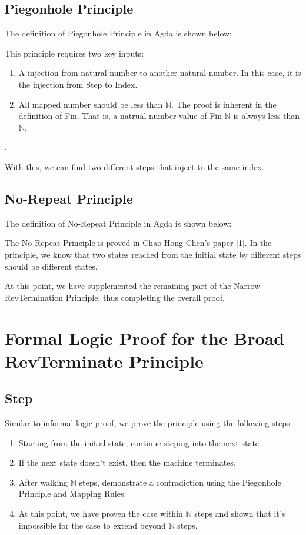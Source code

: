 \subsection{ Piegonhole Principle }
The definition of Piegonhole Principle in Agda is shown below:



This principle requires two key inputs:
\begin{enumerate}[1.]
    \item A injection from natural number to another natural number. In this case, it is the injection from Step to Index. 
    \item All mapped number should be less than $\mathbb{N}$.  The proof is inherent in the definition of Fin.  That is, a natrual number value of Fin $\mathbb{N}$ is always less than $\mathbb{N}$.
\end{enumerate}.

With this, we can find two different steps that inject to the same index.

\subsection{ No-Repeat Principle }
The definition of No-Repeat Principle in Agda is shown below:

The No-Repeat Principle is proved in Chao-Hong Chen's paper [1].  
In the principle, we know that two states reached from the initial state by different steps should be different states.



At this point, we have supplemented the remaining part of the Narrow RevTermination Principle, thus completing the overall proof.

\section{Formal Logic Proof for the Broad RevTerminate Principle}

\subsection{ Step }


Similar to informal logic proof, we prove the principle using the following steps:
\begin{enumerate}[1.]
    \item Starting from the initial state, continue steping into the next state.
    \item If the next state doesn't exist, then the machine terminates.
    \item After walking $\mathbb{N}$ steps, demonstrate a contradiction using the Piegonhole Principle and Mapping Rules.
    \item At this point, we have proven the case within $\mathbb{N}$ steps and shown that it's impossible for the case to extend beyond $\mathbb{N}$ steps.
\end{enumerate}

